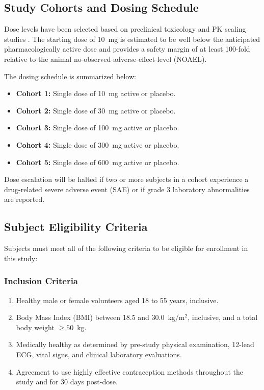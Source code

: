 \subsection{Study Cohorts and Dosing Schedule}

Dose levels have been selected based on preclinical toxicology and PK scaling studies \citep{sterling2025scaling}. The starting dose of 10~mg is estimated to be well below the anticipated pharmacologically active dose and provides a safety margin of at least 100-fold relative to the animal no-observed-adverse-effect-level (NOAEL). 

The dosing schedule is summarized below:
\begin{itemize}
  \item \textbf{Cohort 1:} Single dose of 10~mg active or placebo.
  \item \textbf{Cohort 2:} Single dose of 30~mg active or placebo.
  \item \textbf{Cohort 3:} Single dose of 100~mg active or placebo.
  \item \textbf{Cohort 4:} Single dose of 300~mg active or placebo.
  \item \textbf{Cohort 5:} Single dose of 600~mg active or placebo.
\end{itemize}

Dose escalation will be halted if two or more subjects in a cohort experience a drug-related severe adverse event (SAE) or if grade 3 laboratory abnormalities are reported.

\subsection{Subject Eligibility Criteria}

Subjects must meet all of the following criteria to be eligible for enrollment in this study:

\subsubsection{Inclusion Criteria}
\begin{enumerate}[label=\lbrack\arabic*\rbrack]
  \item Healthy male or female volunteers aged 18 to 55 years, inclusive.
  \item Body Mass Index (BMI) between 18.5 and 30.0~kg/m$^2$, inclusive, and a total body weight $\ge 50$~kg.
  \item Medically healthy as determined by pre-study physical examination, 12-lead ECG, vital signs, and clinical laboratory evaluations.
  \item Agreement to use highly effective contraception methods throughout the study and for 30 days post-dose.
\end{enumerate}


